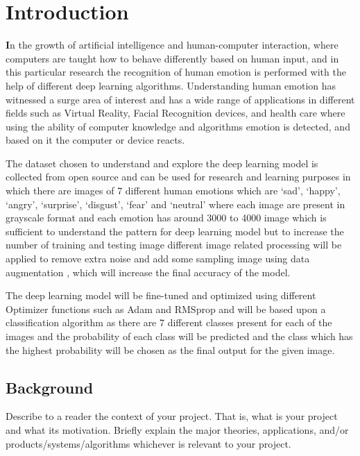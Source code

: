 \chapter{Introduction}
\label{ch:into} %

\textbf In the growth of artificial intelligence and human-computer interaction, where computers are taught how to behave differently based on human input, and in this particular research the recognition of human emotion is performed with the help of different deep learning algorithms. Understanding human emotion has witnessed a surge area of interest and has a wide range of applications in different fields such as Virtual Reality, Facial Recognition devices, and health care where using the ability of computer knowledge and algorithms emotion is detected, and based on it the computer or device reacts.

The dataset \cite{Kaggle} chosen to understand and explore the deep learning model is collected from open source and can be used for research and learning purposes in which there are images of 7 different human emotions which are ‘sad’, ‘happy’, ‘angry’, ‘surprise’, ‘disgust’, ‘fear’ and ‘neutral’ where each image are present in grayscale format and each emotion has around 3000 to 4000 image which is sufficient to understand the pattern for deep learning model but to increase the number of training and testing image different image related processing will be applied to remove extra noise and add some sampling image using data augmentation \cite{Takimoglu}, which will increase the final accuracy of the model. 

The deep learning model will be fine-tuned and optimized using different Optimizer functions such as Adam \cite{Adam} and RMSprop \cite{Deepchecks} and will be based upon a classification algorithm as there are 7 different classes present for each of the images and the probability of each class will be predicted and the class which has the highest probability will be chosen as the final output for the given image.

\section{Background}
\label{sec:into_back}
Describe to a reader the context of your project. That is, what is your project and what its motivation. Briefly explain the major theories, applications, and/or products/systems/algorithms whichever is relevant to your project.

